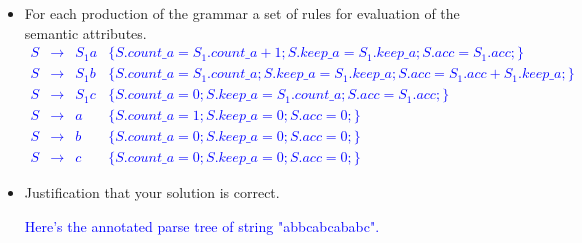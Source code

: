 \documentclass[10pt]{article}
\begin{document}
\begin{enumerate}
\begin{itemize}
{                    }
              \item For each production of the grammar a set of rules for evaluation of the semantic attributes.
                    \textcolor{blue}{
                        \[\begin{array}{clll}
                                S & \rightarrow & S_1a & \{S.count\_a=S_1.count\_a+1;S.keep\_a=S_1.keep\_a;S.acc=S_1.acc;\}           \\
                                S & \rightarrow & S_1b & \{S.count\_a=S_1.count\_a;S.keep\_a=S_1.keep\_a;S.acc=S_1.acc+S_1.keep\_a;\} \\
                                S & \rightarrow & S_1c & \{S.count\_a=0;S.keep\_a=S_1.count\_a;S.acc=S_1.acc;\}                       \\
                                S & \rightarrow & a    & \{S.count\_a=1;S.keep\_a=0;S.acc=0;\}                                        \\
                                S & \rightarrow & b    & \{S.count\_a=0;S.keep\_a=0;S.acc=0;\}                                        \\
                                S & \rightarrow & c    & \{S.count\_a=0;S.keep\_a=0;S.acc=0;\}
                            \end{array}\]
                    }
              \item Justification that your solution is correct.\\
                    \textcolor{blue}{
                        Here's the annotated parse tree of string "abbcabcababc".
                        \begin{center}
\end{center}}
\end{itemize}
\end{enumerate}
\end{document}
